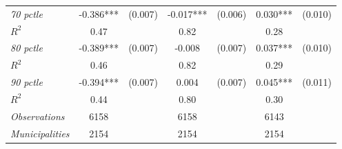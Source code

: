 \begin{tabular}{lcccccc}
\textit{70 pctle}          		  &  -0.386***    & (0.007)      &   -0.017***        &  (0.006)      &     0.030***  &    (0.010)       \\
$R^{2}$			           	   		  &  0.47   & 	   &     0.82   	&		 &     0.28   &   \\

\textit{80 pctle}          		  &  -0.389***    & (0.007)      &   -0.008        &  (0.007)      &     0.037***  &    (0.010)       \\
$R^{2}$			           	   		  &  0.46   & 	   &     0.82   	&		 &     0.29   &   \\

\textit{90 pctle}          		  &  -0.394***    & (0.007)      &   0.004        &  (0.007)      &     0.045***  &    (0.011)       \\
$R^{2}$			           	   		  &  0.44   & 	   &     0.80   	&		 &     0.30   &  \\


\hline		

\textit{Observations}                 &   6158    &   & 6158    &  &  6143   &  		\\
\textit{Municipalities}               &   2154   &   & 2154   &  &  2154  &  		\\
\hline		
\hline		

\end{tabular}%
